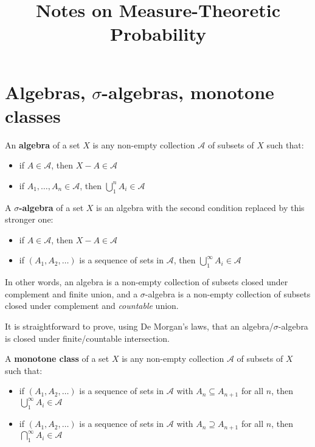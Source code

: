 \documentclass[a4paper,14pt]{article}
\title{Notes on Measure-Theoretic Probability}
\begin{document}
\maketitle
\section{Algebras, $\sigma$-algebras, monotone classes}
An \textbf{algebra} of a set $X$ is any non-empty collection $\mathcal{A}$ of subsets of $X$ such that:

\begin{itemize}
    \item if $A \in \mathcal{A}$, then $X-A \in \mathcal{A}$
    \item if $A_1, \ldots, A_n \in \mathcal{A}$, then $\bigcup_1^n A_i \in \mathcal{A}$
\end{itemize}

A \textbf{$\sigma$-algebra} of a set $X$ is an algebra with the second condition replaced by this stronger one:

\begin{itemize}
    \item if $A \in \mathcal{A}$, then $X-A \in \mathcal{A}$
    \item if $(A_1, A_2, \ldots)$ is a sequence of sets in $\mathcal{A}$, then $\bigcup_1^{\infty} A_i \in \mathcal{A}$
\end{itemize}

In other words, an algebra is a non-empty collection of subsets closed under complement and finite union, and a $\sigma$-algebra is a non-empty collection of subsets closed under complement and \textit{countable} union.

It is straightforward to prove, using De Morgan's laws, that an algebra/$\sigma$-algebra is closed under finite/countable intersection.

A \textbf{monotone class} of a set $X$ is any non-empty collection $\mathcal{A}$ of subsets of $X$ such that:

\begin{itemize}
    \item if $(A_1, A_2, \ldots)$ is a sequence of sets in $\mathcal{A}$ with $A_n \subseteq A_{n+1}$ for all $n$, then $\bigcup_1^{\infty} A_i \in \mathcal{A}$
    \item if $(A_1, A_2, \ldots)$ is a sequence of sets in $\mathcal{A}$ with $A_n \supseteq A_{n+1}$ for all $n$, then $\bigcap_1^{\infty} A_i \in \mathcal{A}$
\end{itemize}
\end{document}

